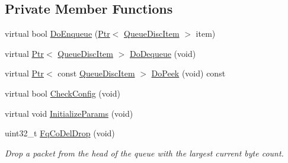 \subsection*{Private Member Functions}
\begin{DoxyCompactItemize}
\item 
virtual bool \hyperlink{classns3_1_1FqCoDelQueueDisc_a9763ff304b86d8c3d2f951d20e102d0a}{Do\+Enqueue} (\hyperlink{classns3_1_1Ptr}{Ptr}$<$ \hyperlink{classns3_1_1QueueDiscItem}{Queue\+Disc\+Item} $>$ item)
\item 
virtual \hyperlink{classns3_1_1Ptr}{Ptr}$<$ \hyperlink{classns3_1_1QueueDiscItem}{Queue\+Disc\+Item} $>$ \hyperlink{classns3_1_1FqCoDelQueueDisc_a2b531c934b2559ab878dc97f95f2ca3e}{Do\+Dequeue} (void)
\item 
virtual \hyperlink{classns3_1_1Ptr}{Ptr}$<$ const \hyperlink{classns3_1_1QueueDiscItem}{Queue\+Disc\+Item} $>$ \hyperlink{classns3_1_1FqCoDelQueueDisc_ad17794fb594849c91102f5cc267b55ca}{Do\+Peek} (void) const 
\item 
virtual bool \hyperlink{classns3_1_1FqCoDelQueueDisc_a18368ef335c681f62b337862583068a7}{Check\+Config} (void)
\item 
virtual void \hyperlink{classns3_1_1FqCoDelQueueDisc_ae4463340ee6d6a4c6d9a267ea9e3aa35}{Initialize\+Params} (void)
\item 
uint32\+\_\+t \hyperlink{classns3_1_1FqCoDelQueueDisc_a81c4f704aadd923d9ca96c5224d10f6d}{Fq\+Co\+Del\+Drop} (void)
\begin{DoxyCompactList}\small\item\em Drop a packet from the head of the queue with the largest current byte count. \end{DoxyCompactList}\end{DoxyCompactItemize}
